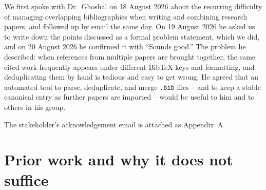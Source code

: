 \documentclass[11pt,a4paper]{article}
\begin{document}
We first spoke with Dr.\ Ghoshal on 18 August 2026 about the recurring
difficulty of managing overlapping bibliographies when writing and
combining research papers, and followed up by email the same day. On
19 August 2026 he asked us to write down the points discussed as a formal
problem statement, which we did, and on 20 August 2026 he confirmed it with
``Sounds good.'' The problem he described: when references from multiple
papers are brought together, the same cited work frequently appears under
different BibTeX keys and formatting, and deduplicating them by hand is
tedious and easy to get wrong. He agreed that an automated tool to parse,
deduplicate, and merge \texttt{.bib} files -- and to keep a stable
canonical entry as further papers are imported -- would be useful to him
and to others in his group.

The stakeholder's acknowledgement email is attached as Appendix~A.

\section{Prior work and why it does not suffice}
\end{document}
